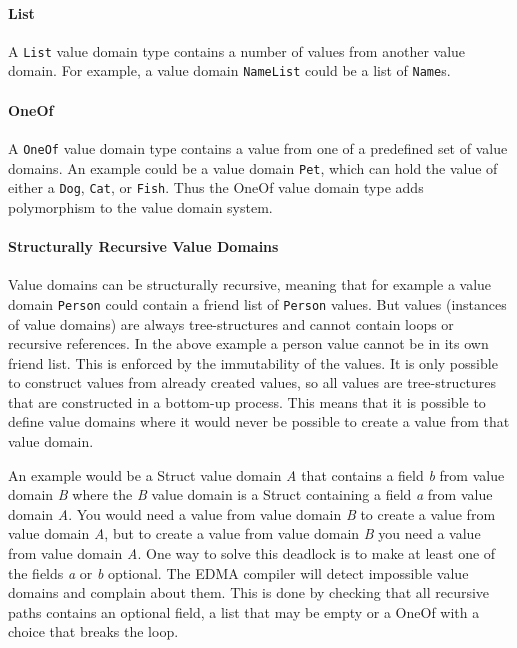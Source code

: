 \paragraph{List}

A \texttt{List} value domain type contains a number of values from
another value domain. For example, a value domain \texttt{NameList}
could be a list of \texttt{Name}s.


\paragraph{OneOf}

A \texttt{OneOf} value domain type contains a value from one of a
predefined set of value domains. An example could be a value domain
\texttt{Pet}, which can hold the value of either a \texttt{Dog}, \texttt{Cat},
or \texttt{Fish}. Thus the OneOf value domain type adds polymorphism
to the value domain system. 


\paragraph{Structurally Recursive Value Domains}

Value domains can be structurally recursive, meaning that for example
a value domain \texttt{Person} could contain a friend list of \texttt{Person}
values. But values (instances of value domains) are always tree-structures
and cannot contain loops or recursive references. In the above example
a person value cannot be in its own friend list. This is enforced
by the immutability of the values. It is only possible to construct
values from already created values, so all values are tree-structures
that are constructed in a bottom-up process. This means that it is
possible to define value domains where it would never be possible
to create a value from that value domain. 

An example would be a Struct value domain \emph{A} that contains a
field \emph{b} from value domain \emph{B} where the \emph{B} value
domain is a Struct containing a field \emph{a} from value domain \emph{A}.
You would need a value from value domain \emph{B} to create a value
from value domain \emph{A}, but to create a value from value domain
\emph{B} you need a value from value domain \emph{A}. One way to solve
this deadlock is to make at least one of the fields \emph{a} or \emph{b}
optional. The EDMA compiler will detect impossible value domains and
complain about them. This is done by checking that all recursive paths
contains an optional field, a list that may be empty or a OneOf with
a choice that breaks the loop.

